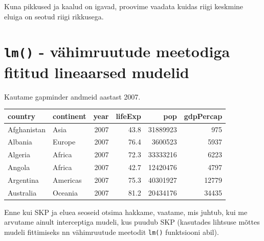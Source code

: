 \documentclass[]{book}
\newenvironment{Shaded}{\begin{snugshade}}{\end{snugshade}}
\newcommand{\KeywordTok}[1]{\textcolor[rgb]{0.13,0.29,0.53}{\textbf{#1}}}
\newcommand{\DecValTok}[1]{\textcolor[rgb]{0.00,0.00,0.81}{#1}}
\newcommand{\StringTok}[1]{\textcolor[rgb]{0.31,0.60,0.02}{#1}}
\newcommand{\CommentTok}[1]{\textcolor[rgb]{0.56,0.35,0.01}{\textit{#1}}}
\newcommand{\OperatorTok}[1]{\textcolor[rgb]{0.81,0.36,0.00}{\textbf{#1}}}
\newcommand{\NormalTok}[1]{#1}
\begin{document}
Kuna pikkused ja kaalud on igavad, proovime vaadata kuidas riigi
keskmine eluiga on seotud riigi rikkusega.

\section*{\texorpdfstring{\texttt{lm()} - vähimruutude meetodiga fititud
lineaarsed
mudelid}{lm() - vähimruutude meetodiga fititud lineaarsed mudelid}}\label{lm---vahimruutude-meetodiga-fititud-lineaarsed-mudelid}

Kautame gapminder andmeid aastast 2007.

\begin{Shaded}
\end{Shaded}

\begin{tabular}{l|l|r|r|r|r}
\hline
country & continent & year & lifeExp & pop & gdpPercap\\
\hline
Afghanistan & Asia & 2007 & 43.8 & 31889923 & 975\\
\hline
Albania & Europe & 2007 & 76.4 & 3600523 & 5937\\
\hline
Algeria & Africa & 2007 & 72.3 & 33333216 & 6223\\
\hline
Angola & Africa & 2007 & 42.7 & 12420476 & 4797\\
\hline
Argentina & Americas & 2007 & 75.3 & 40301927 & 12779\\
\hline
Australia & Oceania & 2007 & 81.2 & 20434176 & 34435\\
\hline
\end{tabular}

Enne kui SKP ja eluea seoseid otsima hakkame, vaatame, mis juhtub, kui
me arvutame ainult interceptiga mudeli, kus puudub SKP (kasutades
lihtsuse mõttes mudeli fittimiseks nn vähimruutude meetodit
\texttt{lm()} funktsiooni abil).
\end{document}
